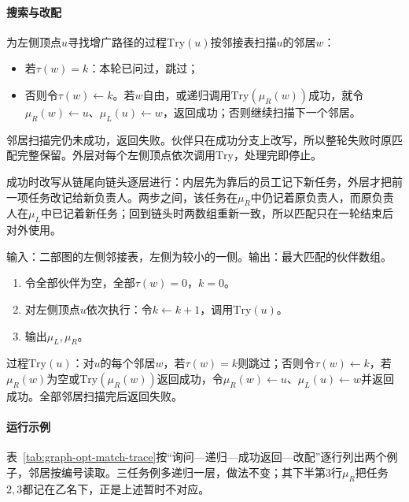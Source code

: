 \paragraph{搜索与改配}
为左侧顶点$u$寻找增广路径的过程$\mathrm{Try}(u)$按邻接表扫描$u$的邻居$w$：
\begin{itemize}
  \item 若$\tau(w)=k$：本轮已问过，跳过；
  \item 否则令$\tau(w)\gets k$。若$w$自由，或递归调用$\mathrm{Try}(\mu_R(w))$成功，就令$\mu_R(w)\gets u$、$\mu_L(u)\gets w$，返回成功；否则继续扫描下一个邻居。
\end{itemize}
邻居扫描完仍未成功，返回失败。伙伴只在成功分支上改写，所以整轮失败时原匹配完整保留。外层对每个左侧顶点依次调用$\mathrm{Try}$，处理完即停止。

成功时改写从链尾向链头逐层进行：内层先为靠后的员工记下新任务，外层才把前一项任务改记给新负责人。两步之间，该任务在$\mu_R$中仍记着原负责人，而原负责人在$\mu_L$中已记着新任务；回到链头时两数组重新一致，所以匹配只在一轮结束后对外使用。

\begin{algorithm}[匈牙利算法]
\label{alg:graph-opt-augmenting-matching}
输入：二部图的左侧邻接表，左侧为较小的一侧。输出：最大匹配的伙伴数组。
\begin{enumerate}
  \item 令全部伙伴为空，全部$\tau(w)=0$，$k=0$。
  \item 对左侧顶点$u$依次执行：令$k\gets k+1$，调用$\mathrm{Try}(u)$。
  \item 输出$\mu_L,\mu_R$。
\end{enumerate}
过程$\mathrm{Try}(u)$：对$u$的每个邻居$w$，若$\tau(w)=k$则跳过；否则令$\tau(w)\gets k$，若$\mu_R(w)$为空或$\mathrm{Try}(\mu_R(w))$返回成功，令$\mu_R(w)\gets u$、$\mu_L(u)\gets w$并返回成功。全部邻居扫描完后返回失败。
\end{algorithm}

\paragraph{运行示例}
表~\ref{tab:graph-opt-match-trace}按“询问—递归—成功返回—改配”逐行列出两个例子，邻居按编号读取。三任务例多递归一层，做法不变；其下半第$3$行$\mu_R$把任务$2,3$都记在乙名下，正是上述暂时不对应。

